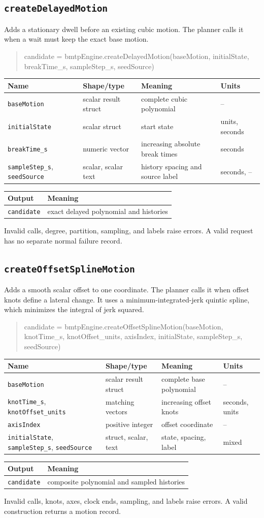 \documentclass[11pt]{article}
\makeatletter
\newcommand{\iface}[5]{#1\par\begin{quote}\small\ttfamily\raggedright #2\par\end{quote}
\begin{tabularx}{\textwidth}{@{}p{.24\textwidth}p{.21\textwidth}Xp{.12\textwidth}@{}}\toprule Name & Shape/type & Meaning & Units \\\midrule #3\\\bottomrule\end{tabularx}
\begin{tabularx}{\textwidth}{@{}p{.30\textwidth}X@{}}\toprule Output & Meaning \\\midrule #4\\\bottomrule\end{tabularx}
\begingroup\sloppy #5\par\endgroup\medskip}
\makeatother
\begin{document}
\subsection{\texttt{createDelayedMotion}}
\iface{Adds a stationary dwell before an existing cubic motion. The planner
calls it when a wait must keep the exact base motion.}
{candidate =\allowbreak{} bmtpEngine.createDelayedMotion(baseMotion,\allowbreak{}
initialState,\allowbreak{} breakTime\_s,\allowbreak{} sampleStep\_s,\allowbreak{}
seedSource)}
{\texttt{baseMotion} & scalar result struct & complete cubic polynomial & -- \\
\texttt{initialState} & scalar struct & start state & units, seconds \\
\texttt{breakTime\_s} & numeric vector & increasing absolute break times & seconds \\
\texttt{sampleStep\_s}, \texttt{seedSource} & scalar, scalar text & history spacing and source label & seconds, --}
{\texttt{candidate} & exact delayed polynomial and histories}
{Invalid calls, degree, partition, sampling, and labels raise errors. A valid
request has no separate normal failure record.}

\subsection{\texttt{createOffsetSplineMotion}}
\iface{Adds a smooth scalar offset to one coordinate. The planner calls it when
offset knots define a lateral change. It uses a minimum-integrated-jerk quintic
spline, which minimizes the integral of jerk squared.}
{candidate =\allowbreak{} bmtpEngine.createOffsetSplineMotion(baseMotion,\allowbreak{}
knotTime\_s,\allowbreak{} knotOffset\_units,\allowbreak{} axisIndex,\allowbreak{}
initialState,\allowbreak{} sampleStep\_s,\allowbreak{} seedSource)}
{\texttt{baseMotion} & scalar result struct & complete base polynomial & -- \\
\texttt{knotTime\_s}, \texttt{knotOffset\_units} & matching vectors & increasing offset knots & seconds, units \\
\texttt{axisIndex} & positive integer & offset coordinate & -- \\
\texttt{initialState}, \texttt{sampleStep\_s}, \texttt{seedSource} & struct, scalar, text & state, spacing, label & mixed}
{\texttt{candidate} & composite polynomial and sampled histories}
{Invalid calls, knots, axes, clock ends, sampling, and labels raise errors. A
valid construction returns a motion record.}
\end{document}
